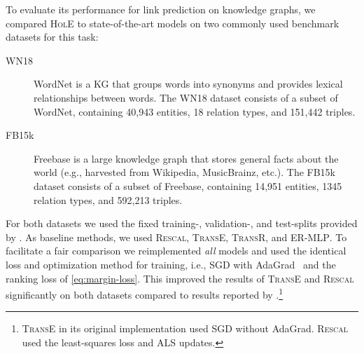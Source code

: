 \documentclass[letterpaper]{article}
\newcommand{\hole}{\textsc{HolE}\xspace}
\newcommand{\transe}{\textsc{TransE}\xspace}
\newcommand{\transr}{\textsc{TransR}\xspace}
\newcommand{\rescal}{\textsc{Rescal}\xspace}
\newcommand{\emlp}{\textsc{ER-MLP}\xspace}
\begin{document}
To evaluate its performance for link prediction on knowledge graphs, 
we compared \hole to state-of-the-art models on two commonly used benchmark
datasets for this task:
\begin{description}
\item[WN18] WordNet is a KG that groups words into synonyms
  and provides lexical relationships between words. The WN18 dataset
  consists of a subset of WordNet, containing 40,943 entities, 18 relation
  types, and 151,442 triples.
\item[FB15k] Freebase is a large knowledge graph that stores general facts
  about the world (e.g., harvested from Wikipedia, MusicBrainz, etc.). The FB15k dataset consists of a subset of Freebase, containing
  14,951 entities, 1345 relation types, and 592,213 triples.
\end{description}
For both datasets we used the fixed training-, validation-, and test-splits
provided by \citet{bordes2013translating}. 
As baseline methods, we used \rescal, \transe, \transr, and \emlp. 
To facilitate a fair comparison we reimplemented \emph{all} models and
used the identical loss and optimization method for training, i.e., 
SGD with AdaGrad~\citep{duchi2011adaptive} and the ranking loss of
\cref{eq:margin-loss}. This improved the results of \transe and
\rescal significantly on both datasets compared to results reported by \citet{bordes2013translating}.\footnote{\transe in its original implementation used SGD without
  AdaGrad. \rescal used the least-squares loss and ALS updates.}
\end{document}
